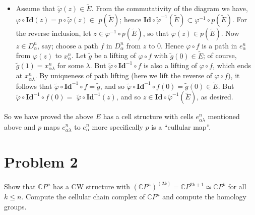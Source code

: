 \documentclass[11pt]{article}
\newcommand{\id}{\mathbf{Id}}
\begin{document}
\begin{itemize}
   \item[] Assume that $\tilde{\varphi}(z) \in \widetilde{E}$. From the commutativity of the diagram we have, $\varphi \circ \id(z)=p\circ\tilde{\varphi}(z) \in$ $p(\widetilde{E})$; hence $\id \circ \tilde{\varphi}^{-1}(\widetilde{E}) \subset \varphi^{-1} \circ p(\widetilde{E})$. For the reverse inclusion, let $z \in \varphi^{-1}\circ p(\widetilde{E})$, so that $\varphi(z) \in p(\widetilde{E})$. Now $z \in D^n_{\alpha}$, say; choose a path $f$ in $D^n_{\alpha}$ from $z$ to $0$. Hence $\varphi \circ f$ is a path in $e^n_{\alpha}$ from $\varphi(z)$ to $x^n_{\alpha}$. Let $\tilde{g}$ be a lifting of $\varphi \circ f$ with $\tilde{g}(0) \in \widetilde{E}$; of course, $\tilde{g}(1)=x^n_{\alpha\lambda}$ for some $\lambda$. But $\tilde{\varphi}\circ \id^{-1} \circ f$ is also a lifting of $\varphi \circ f$, which ends at $x^n_{\alpha\lambda}$. By uniqueness of path lifting (here we lift the reverse of $\varphi \circ f)$, it follows that $\tilde{\varphi} \circ \id^{-1} \circ f=\tilde{g}$, and so $\tilde{\varphi}\circ \id^{-1}\circ f(0)=\tilde{g}(0) \in \widetilde{E}$. But $\tilde{\varphi} \circ \id^{-1} \circ f(0)=$ $\tilde{\varphi} \circ \id^{-1}(z)$, and so $z \in \id \circ \tilde{\varphi}^{-1}(\widetilde{E})$, as desired.
\end{itemize}

\noindent So we have proved the above $E$ has a cell structure with cells $e^n_{\alpha \lambda}$ mentioned above and $p$ maps $e^n_{\alpha \lambda}$ to $e^n_{\alpha}$ more specifically $p$ is a ``cullular map''.


 \section{Problem 2}

 \begin{prob}{}{}
    Show that $\mathbb{C} P^{n}$ has a CW structure with $\left(\mathbb{C} P^{n}\right)^{(2 k)}=\mathbb{C} P^{2 k+1} \simeq \mathbb{C} P^{k}$ for all $k \leq n$. Compute the cellular chain complex of $\mathbb{C} P^{n}$ and compute the homology groups.
 \end{prob}
\end{document}
